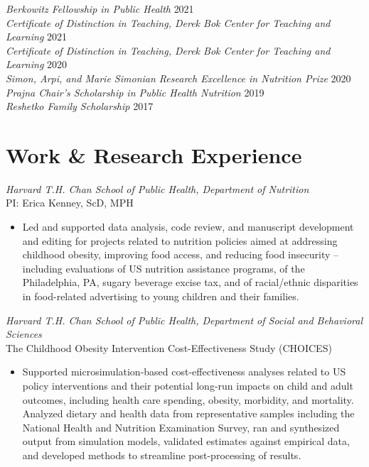 \documentclass{cv_style}
\begin{document}
\textit{Berkowitz Fellowship in Public Health} \hfill {2021}\\
\textit{Certificate of Distinction in Teaching, Derek Bok Center for Teaching and Learning} \hfill {2021}\\
\textit{Certificate of Distinction in Teaching, Derek Bok Center for Teaching and Learning} \hfill {2020}\\
\textit{Simon, Arpi, and Marie Simonian Research Excellence in Nutrition Prize} \hfill {2020} \\
\textit{Prajna Chair's Scholarship in Public Health Nutrition} \hfill 2019 \\
\textit{Reshetko Family Scholarship} \hfill 2017


\section{Work \& Research Experience}

\textit{Harvard T.H. Chan School of Public Health, Department of Nutrition} \\
PI: Erica Kenney, ScD, MPH
\begin{itemize}
    \item Led and supported data analysis, code review, and manuscript development and editing for projects related to nutrition policies aimed at addressing childhood obesity, improving food access, and reducing food insecurity -- including evaluations of US nutrition assistance programs, of the Philadelphia, PA, sugary beverage excise tax, and of racial/ethnic disparities in food-related advertising to young children and their families.
\end{itemize}

\textit{Harvard T.H. Chan School of Public Health, Department of Social and Behavioral Sciences} \\
The Childhood Obesity Intervention Cost-Effectiveness Study (CHOICES)
\begin{itemize}
    \item Supported microsimulation-based cost-effectiveness analyses related to US policy interventions and their potential long-run impacts on child and adult outcomes, including health care spending, obesity, morbidity, and mortality. Analyzed dietary and health data from representative samples including the National Health and Nutrition Examination Survey, ran and synthesized output from simulation models, validated estimates against empirical data, and developed methods to streamline post-processing of results.
\end{itemize}
\end{document}
